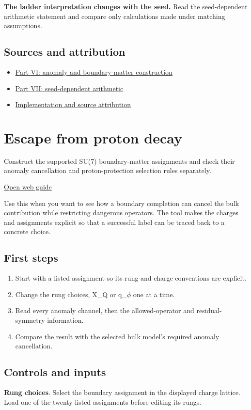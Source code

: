\documentclass[11pt,a4paper]{article}
\begin{document}
\textbf{The ladder interpretation changes with the seed.} Read the seed-dependent arithmetic statement and compare only calculations made under matching assumptions.

\subsection*{Sources and attribution}
\begin{itemize}
\item \href{https://karlesmarin.github.io/ghu-explorer/papers/part-vi/index.html}{Part VI: anomaly and boundary-matter construction}
\item \href{https://karlesmarin.github.io/ghu-explorer/papers/part-vii/index.html}{Part VII: seed-dependent arithmetic}
\item \href{https://github.com/karlesmarin/ghu-lab/blob/main/src/sections/anomalies_section.js}{Implementation and source attribution}
\end{itemize}
\section{Escape from proton decay}
Construct the supported SU(7) boundary-matter assignments and check their anomaly cancellation and proton-protection selection rules separately.

\href{https://karlesmarin.github.io/ghu-explorer/guide/escape/index.html}{Open web guide}

Use this when you want to see how a boundary completion can cancel the bulk contribution while restricting dangerous operators. The tool makes the charges and assignments explicit so that a successful label can be traced back to a concrete choice.
\subsection*{First steps}
\begin{enumerate}
\item Start with a listed assignment so its rung and charge conventions are explicit.
\item Change the rung choices, X\_Q or q\_\ensuremath{\phi} one at a time.
\item Read every anomaly channel, then the allowed-operator and residual-symmetry information.
\item Compare the result with the selected bulk model's required anomaly cancellation.
\end{enumerate}
\subsection*{Controls and inputs}
\textbf{Rung choices}. Select the boundary assignment in the displayed charge lattice. Load one of the twenty listed assignments before editing its rungs.
\end{document}

